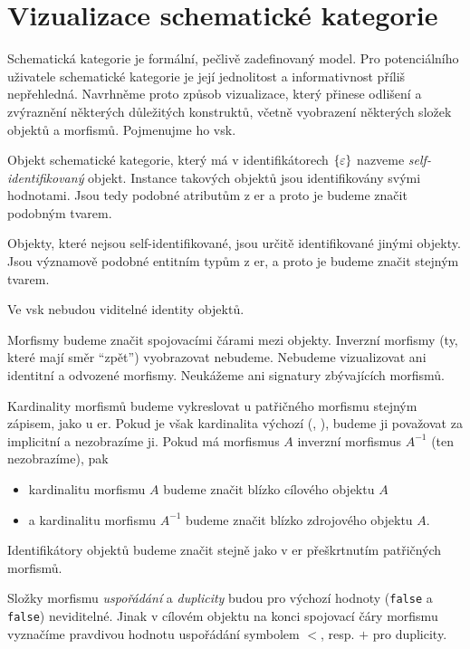 \section{Vizualizace schematické kategorie}\label{section:vsk}

Schematická kategorie je formální, pečlivě zadefinovaný model.
Pro potenciálního uživatele schematické kategorie je její jednolitost a informativnost příliš nepřehledná.
Navrhněme proto způsob vizualizace, který přinese odlišení a zvýraznění některých důležitých konstruktů, včetně vyobrazení některých složek objektů a morfismů.
Pojmenujme ho \acrfull{vsk}.

Objekt schematické kategorie, který má v identifikátorech $\left\{\varepsilon\right\}$ nazveme \emph{self-identifikovaný} objekt.
Instance takových objektů jsou identifikovány svými hodnotami.
Jsou tedy podobné atributům z \acrshort{er} a proto je budeme značit podobným tvarem.

Objekty, které nejsou self-identifikované, jsou určitě identifikované jinými objekty.
Jsou významově podobné entitním typům z \acrshort{er}, a proto je budeme značit stejným tvarem.

Ve \acrshort{vsk} nebudou viditelné identity objektů.

Morfismy budeme značit spojovacími čárami mezi objekty.
Inverzní morfismy (ty, které mají směr \enquote{zpět}) vyobrazovat nebudeme.
Nebudeme vizualizovat ani identitní a odvozené morfismy.
Neukážeme ani signatury zbývajících morfismů.

Kardinality morfismů budeme vykreslovat u patřičného morfismu stejným zápisem, jako u \acrshort{er}.
Pokud je však kardinalita výchozí (\one, \one), budeme ji považovat za implicitní a nezobrazíme ji.
Pokud má morfismus $A$ inverzní morfismus $A^{-1}$ (ten nezobrazíme), pak
\begin{itemize}
  \item kardinalitu morfismu $A$ budeme značit blízko cílového objektu $A$
  \item a kardinalitu morfismu $A^{-1}$ budeme značit blízko zdrojového objektu $A$.
\end{itemize}

Identifikátory objektů budeme značit stejně jako v \acrshort{er} přeškrtnutím patřičných morfismů.

Složky morfismu \emph{uspořádání} a \emph{duplicity} budou pro výchozí hodnoty (\texttt{false} a \texttt{false}) neviditelné.
Jinak v cílovém objektu na konci spojovací čáry morfismu vyznačíme pravdivou hodnotu uspořádání symbolem $<$, resp. $+$ pro duplicity.

